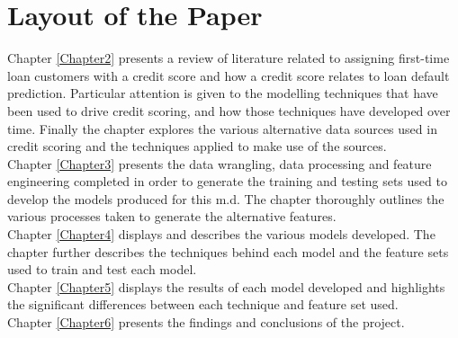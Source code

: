 \section{Layout of the Paper}

Chapter \ref{Chapter2} presents a review of literature related to assigning first-time loan customers with a credit score and how a credit score relates to loan default prediction. Particular attention is given to the modelling techniques that have been used to drive credit scoring, and how those techniques have developed over time. Finally the chapter explores the various alternative data sources used in credit scoring and the techniques applied to make use of the sources. \\

Chapter \ref{Chapter3} presents the data wrangling, data processing and feature engineering completed in order to generate the training and testing sets used to develop the models produced for this m.d. The chapter thoroughly outlines the various processes taken to generate the alternative features. \\

Chapter \ref{Chapter4} displays and describes the various models developed. The chapter further describes the techniques behind each model and the feature sets used to train and test each model. \\

Chapter \ref{Chapter5} displays the results of each model developed and highlights the significant differences between each technique and  feature set used. \\

Chapter \ref{Chapter6} presents the findings and conclusions of the project. 


